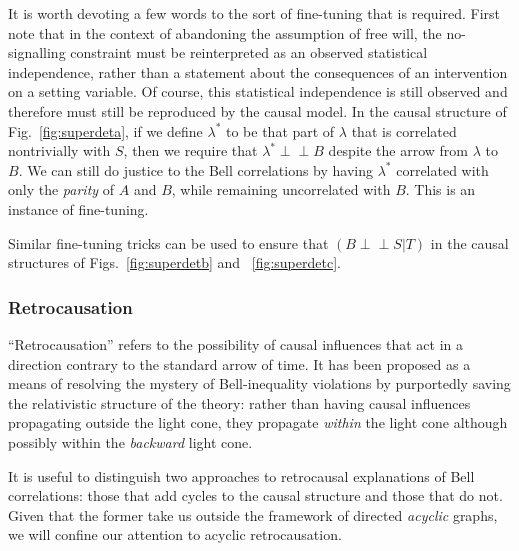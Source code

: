 \documentclass[12pt,onecolumn,nofootinbib]{revtex4-2}
\def\indep{\perp\!\!\!\!\perp}
\begin{document}
It is worth devoting a few words to the sort of fine-tuning that is required.  First note that in the context of abandoning the assumption of free will, the no-signalling constraint must be reinterpreted as an observed statistical independence, rather than a statement about the consequences of an intervention on a setting variable.  Of course, this statistical independence is still observed and therefore must still be reproduced by the causal model. In the causal structure of Fig.~\ref{fig:superdeta}, if we define $\lambda^*$ to be that part of $\lambda$ that is correlated nontrivially with $S$, then we require that $\lambda^* \indep B$ despite the arrow from $\lambda$ to $B$.  We can still do justice to the Bell correlations by having $\lambda^*$ correlated with only
the \emph{parity} of $A$ and $B$, while remaining uncorrelated with $B$.  This is an instance of fine-tuning.

Similar fine-tuning tricks can be used to ensure that $(B \indep S|T)$ in the causal structures of Figs.~\ref{fig:superdetb} and ~\ref{fig:superdetc}.


\subsubsection{Retrocausation}

``Retrocausation'' refers to the possibility of causal influences that act in a direction contrary to the standard arrow of time. It has been proposed as a means of resolving the mystery of Bell-inequality violations \cite{deBeauregard1953,Cramer1986,Sutherland2006,Price2008,Wharton2010} by purportedly saving the relativistic structure of the theory: rather than having causal influences propagating outside the light cone, they propagate \emph{within} the light cone although possibly within the \emph{backward} light cone.

It is useful to distinguish two approaches to retrocausal explanations of Bell correlations: those that add cycles to the causal structure and those that do not.  Given that the former take us outside the framework of directed \emph{acyclic} graphs, we will confine our attention to acyclic retrocausation.
\end{document}
